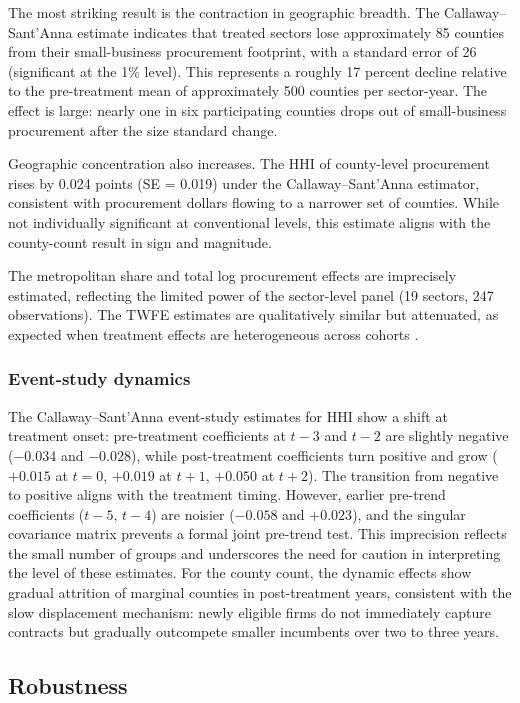 \documentclass[12pt]{article}
\begin{document}
The most striking result is the contraction in geographic breadth. The Callaway--Sant'Anna estimate indicates that treated sectors lose approximately 85 counties from their small-business procurement footprint, with a standard error of 26 (significant at the 1\% level). This represents a roughly 17 percent decline relative to the pre-treatment mean of approximately 500 counties per sector-year. The effect is large: nearly one in six participating counties drops out of small-business procurement after the size standard change.

Geographic concentration also increases. The HHI of county-level procurement rises by 0.024 points (SE = 0.019) under the Callaway--Sant'Anna estimator, consistent with procurement dollars flowing to a narrower set of counties. While not individually significant at conventional levels, this estimate aligns with the county-count result in sign and magnitude.

The metropolitan share and total log procurement effects are imprecisely estimated, reflecting the limited power of the sector-level panel (19 sectors, 247 observations). The TWFE estimates are qualitatively similar but attenuated, as expected when treatment effects are heterogeneous across cohorts \citep{goodman2021, sun2021}.

\subsubsection*{Event-study dynamics} The Callaway--Sant'Anna event-study estimates for HHI show a shift at treatment onset: pre-treatment coefficients at $t - 3$ and $t - 2$ are slightly negative ($-0.034$ and $-0.028$), while post-treatment coefficients turn positive and grow ($+0.015$ at $t = 0$, $+0.019$ at $t + 1$, $+0.050$ at $t + 2$). The transition from negative to positive aligns with the treatment timing. However, earlier pre-trend coefficients ($t - 5$, $t - 4$) are noisier ($-0.058$ and $+0.023$), and the singular covariance matrix prevents a formal joint pre-trend test. This imprecision reflects the small number of groups and underscores the need for caution in interpreting the level of these estimates. For the county count, the dynamic effects show gradual attrition of marginal counties in post-treatment years, consistent with the slow displacement mechanism: newly eligible firms do not immediately capture contracts but gradually outcompete smaller incumbents over two to three years.

\subsection{Robustness}
\end{document}
